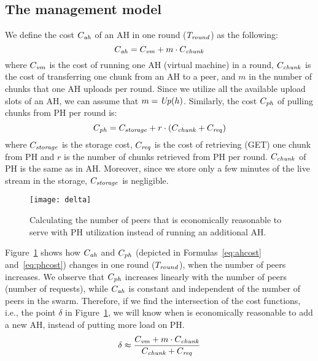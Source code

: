 \subsection{The management model} \label{ahmgt}
We define the cost $C_{\mathit{ah}}$ of an AH in one round ($T_{\mathit{round}}$) as the following:
\begin{equation}\label{eq:ahcost}
C_{\mathit{ah}} = C_{\mathit{vm}} + m \cdot C_{\mathit{chunk}}
\end{equation}
where $C_{\mathit{vm}}$ is the cost of running one AH (virtual machine) in a round,
$C_{\mathit{chunk}}$ is the cost of transferring one chunk from an AH to a peer, and
$m$ in the number of chunks that one AH uploads per round. Since we utilize
all the available upload slots of an AH, we can assume that $m = \mathit{Up}(h)$.
Similarly, the cost $C_{\mathit{ph}}$ of pulling chunks from PH per round is:
\begin{equation}\label{eq:phcost}
C_{\mathit{ph}} = C_{\mathit{storage}} + r \cdot (C_{\mathit{chunk}} + C_{\mathit{req}}) 
\end{equation}
where $C_{\mathit{storage}}$ is the storage cost, $C_{\mathit{req}}$ is the cost of retrieving (GET)
one chunk from PH and $r$ is the number of chunks retrieved from PH per round.
$C_{\mathit{chunk}}$ of PH is the same as in AH. Moreover, since we store only a few
minutes of the live stream in the storage, $C_{\mathit{storage}}$ is negligible.
\begin{figure}[t]
\centering
\texttt{[image: delta]}
\caption{\small Calculating the number of peers that is economically reasonable to serve with PH utilization instead of running an additional AH.}
\label{fig:delta}
\end{figure}

Figure~\ref{fig:delta} shows how $C_{\mathit{ah}}$ and $C_{\mathit{ph}}$ (depicted in
Formulas~\ref{eq:ahcost} and~\ref{eq:phcost}) changes in one round
($T_{\mathit{round}}$), when the number of peers increases. We observe that $C_{\mathit{ph}}$
increases linearly with the number of peers (number of requests), while $C_{\mathit{ah}}$
is constant and independent of the number of peers in the swarm. Therefore, if
we find the intersection of the cost functions, i.e., the point $\delta$ in
Figure~\ref{fig:delta}, we will know when is economically reasonable to add a
new AH, instead of putting more load on PH.
\begin{equation}\label{eq:delta}
\delta \approx \frac{C_{\mathit{vm}} + m \cdot C_{\mathit{chunk}}}{C_{\mathit{chunk}} + C_{\mathit{req}}}
\end{equation}

